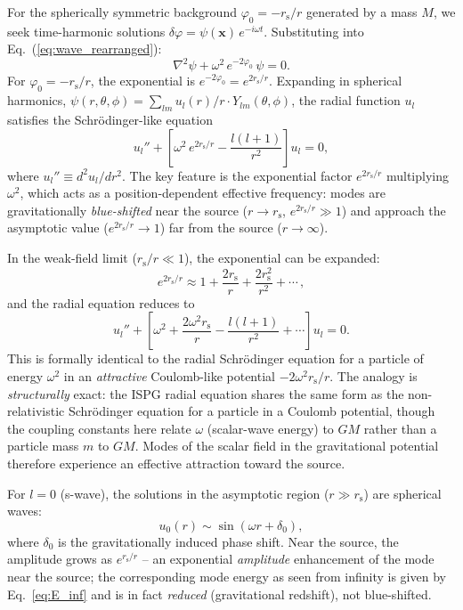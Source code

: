 \documentclass[aps,prd,onecolumn,superscriptaddress,nofootinbib,showpacs,12pt,notitlepage]{revtex4-2}
\newcommand{\rs}{r_{\mathrm{s}}}
\begin{document}
For the spherically symmetric background
$\varphi_0 = -\rs/r$ generated by a mass $M$,
we seek time-harmonic solutions
$\delta\varphi = \psi(\mathbf{x})\,e^{-i\omega t}$.
Substituting into Eq.~(\ref{eq:wave_rearranged}):
\begin{equation}\label{eq:helmholtz}
  \nabla^{2}\psi
  + \omega^{2}\,e^{-2\varphi_0}\,\psi = 0.
\end{equation}
For $\varphi_0 = -\rs/r$, the exponential
is $e^{-2\varphi_0} = e^{2\rs/r}$.
Expanding in spherical harmonics,
$\psi(r,\theta,\phi) = \sum_{lm} u_l(r)/r \cdot Y_{lm}(\theta,\phi)$,
the radial function $u_l$ satisfies the
Schr\"odinger-like equation
\begin{equation}\label{eq:schrodinger}
  \boxed{
  u_l'' + \left[\omega^{2}\,e^{2\rs/r}
    - \frac{l(l+1)}{r^{2}}\right] u_l = 0,
  }
\end{equation}
where $u_l'' \equiv d^2 u_l/dr^2$.
The key feature is the exponential factor
$e^{2\rs/r}$ multiplying $\omega^2$, which acts as a
position-dependent effective frequency:
modes are gravitationally \emph{blue-shifted}
near the source ($r \to \rs$, $e^{2\rs/r} \gg 1$)
and approach the asymptotic value ($e^{2\rs/r} \to 1$)
far from the source ($r \to \infty$).

In the weak-field limit ($\rs/r \ll 1$), the exponential
can be expanded:
\begin{equation}\label{eq:weak_exp}
  e^{2\rs/r} \approx 1 + \frac{2\rs}{r}
  + \frac{2\rs^2}{r^2} + \cdots\,,
\end{equation}
and the radial equation reduces to
\begin{equation}\label{eq:radial_weak}
  u_l'' + \left[\omega^{2}
    + \frac{2\omega^2\rs}{r}
    - \frac{l(l+1)}{r^{2}} + \cdots\right] u_l = 0.
\end{equation}
This is formally identical to the radial Schr\"odinger
equation for a particle of energy $\omega^2$ in an
\emph{attractive} Coulomb-like potential
$-2\omega^2\rs/r$.  The analogy is \emph{structurally}
exact: the ISPG radial equation shares the same form as
the non-relativistic Schr\"odinger equation for a particle
in a Coulomb potential, though the coupling constants here
relate $\omega$ (scalar-wave energy) to $GM$ rather than
a particle mass $m$ to $GM$.  Modes of the scalar field
in the gravitational potential therefore experience an
effective attraction toward the source.

For $l=0$ (s-wave), the solutions in the asymptotic
region ($r \gg \rs$) are spherical waves:
\begin{equation}
  u_0(r) \sim \sin(\omega r + \delta_0),
\end{equation}
where $\delta_0$ is the gravitationally induced
phase shift.  Near the source, the amplitude
grows as $e^{\rs/r}$ -- an exponential
\emph{amplitude} enhancement of the mode near the
source; the corresponding mode energy as seen from
infinity is given by Eq.~\eqref{eq:E_inf} and is in
fact \emph{reduced} (gravitational redshift), not
blue-shifted.
\end{document}
